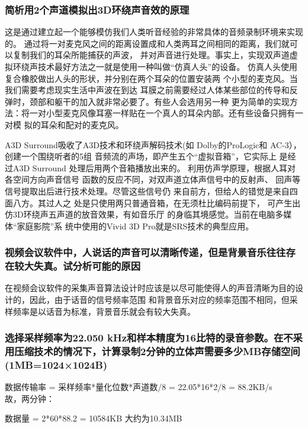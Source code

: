 \documentclass[UTF8,a4paper,AutoFakeBold,AutoFakeSlant]{ctexart}
\begin{document}
\subsubsection{简析用2个声道模拟出3D环绕声音效的原理}

这是通过建立起一个能够模仿我们人类听音经验的非常具体的音频录制环境来实现的。
通过将一对麦克风之间的距离设置成和人类两耳之间相同的距离，我们就可以复制我们的耳朵所能捕获的声波，
并对声音进行处理。事实上，实现双声道虚拟环绕声技术最好方法之一就是使用一种叫做“仿真人头”的设备。
仿真人头使用复合橡胶做出人头的形状，并分别在两个耳朵的位置安装两
个小型的麦克风。当我们需要考虑现实生活中声波在到达
耳膜之前需要经过人体某些部位的传导和反弹时，颈部和躯干的加入就非常必要了。有些人会选用另一种
更为简单的实现方法：将一对小型麦克风像耳塞一样贴在一个真人的耳朵内部。还有些设备只拥有一对模
拟的耳朵和配对的麦克风。 

A3D Surround吸收了A3D技术和环绕声解码技术(如
Dolby的ProLogic和 AC-3），创建一个围绕听者的5组
音频流的声场，即产生五个“虚拟音箱”，它实际上
是经过A3D Surround 处理后用两个音箱播放出来的。
利用仿声学原理，根据人耳对各空间方向声音信号
函数的反应不同，对双声道立体声信号中的反射声、
回声等信号提取出后进行技术处理。尽管这些信号仍
来自前方，但给人的错觉是来自四面八方。其过人之
处是只使用两只普通音箱，在无须杜比编码前提下，
可产生出仿3D环绕声五声道的放音效果，有如音乐厅
的身临其境感觉。当前在电脑多媒体“家庭影院”系
统中使用的Vivid 3D Pro就是SRS技术的典型应用。


\subsubsection{视频会议软件中，人说话的声音可以清晰传递，但是背景音乐往往存在较大失真。试分析可能的原因}

在视频会议软件的采集声音算法设计时应该是以尽可能使得人的声音清晰为目的设计的，因此，由于话音的信号频率范围
和背景音乐对应的频率范围不相同，但采样频率是以话音为标准，背景音乐就会有较大失真。


\subsubsection{选择采样频率为22.050 kHz和样本精度为16比特的录音参数。在不采用压缩技术的情况下，计算录制2分钟的立体声需要多少MB存储空间(1MB=1024×1024B)}

数据传输率 = 采样频率*量化位数*声道数/8 = 22.05*16*2/8 = 88.2KB/s \\
故，两分钟：

数据量 = 2*60*88.2 = 10584KB 大约为10.34MB
\end{document}
